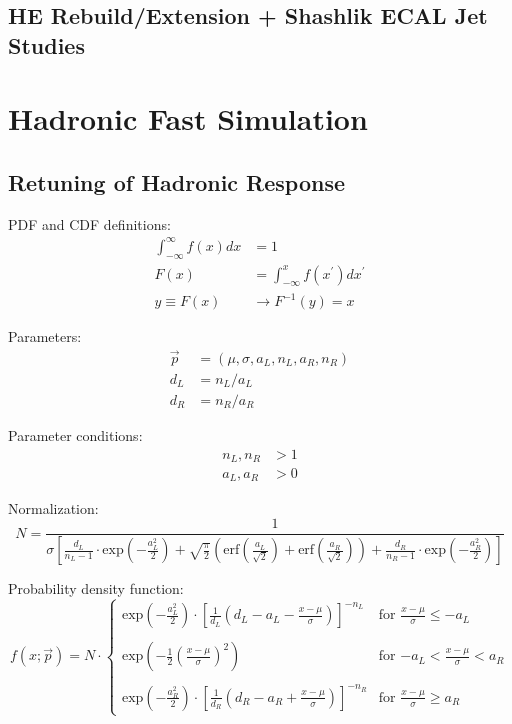 \subsection{HE Rebuild/Extension + Shashlik ECAL Jet Studies}


\section{Hadronic Fast Simulation}

\subsection{Retuning of Hadronic Response}

PDF and CDF definitions:
\begin{align}
\int_{-\infty}^{\infty} f(x)dx &= 1 \\
F(x) &= \int_{-\infty}^{x} f(x^{\prime})dx^{\prime} \\
y \equiv F(x) &\rightarrow F^{-1}(y) = x
\end{align}

Parameters:
\begin{align}
\vec{p} &= (\mu,\sigma,a_{L},n_{L},a_{R},n_{R}) \\
d_{L} &= n_{L}/a_{L} \\
d_{R} &= n_{R}/a_{R}
\end{align}

Parameter conditions:
\begin{align}
n_{L}, n_{R} &> 1\\
a_{L}, a_{R} &> 0
\end{align}

Normalization:
\begin{equation}
N = \frac{1}{\sigma\left[\frac{d_{L}}{n_{L}-1} \cdot \text{exp}\left(-\frac{a_{L}^{2}}{2}\right) + \sqrt{\frac{\pi}{2}}\left(\text{erf}\left(\frac{a_{L}}{\sqrt{2}}\right)+\text{erf}\left(\frac{a_{R}}{\sqrt{2}}\right)\right) + \frac{d_{R}}{n_{R}-1} \cdot \text{exp}\left(-\frac{a_{R}^{2}}{2}\right)  \right]}
\end{equation}

Probability density function:
\begin{equation}
f(x;\vec{p}) = N \cdot \begin{cases}
\text{exp}\left(-\frac{a_{L}^{2}}{2}\right) \cdot \left[\frac{1}{d_{L}}\left(d_{L} - a_{L} - \frac{x-\mu}{\sigma}\right)\right]^{-n_{L}} & \text{for $\frac{x-\mu}{\sigma} \leq -a_{L}$} \\
\\
\text{exp}\left(-\frac{1}{2}\left(\frac{x-\mu}{\sigma}\right)^2\right) & \text{for $-a_{L} < \frac{x-\mu}{\sigma} < a_{R}$} \\
\\
\text{exp}\left(-\frac{a_{R}^{2}}{2}\right) \cdot \left[\frac{1}{d_{R}}\left(d_{R} - a_{R} + \frac{x-\mu}{\sigma}\right)\right]^{-n_{R}} & \text{for $\frac{x-\mu}{\sigma} \geq a_{R}$}
\end{cases}
\end{equation}
\newpage

